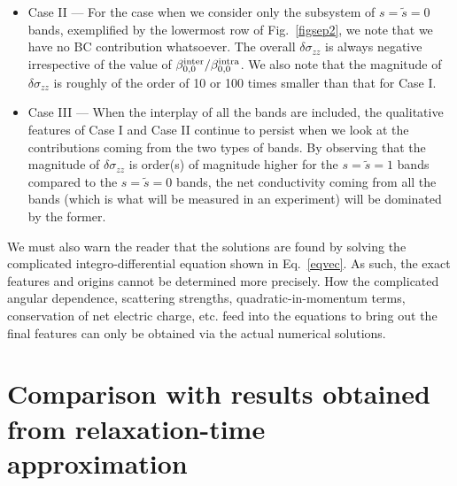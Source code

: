 \documentclass[aps,prb,onecolumn,nofootinbib,citeautoscript,10pt]{revtex4-2}
\begin{document}
\begin{itemize}
$ \delta \sigma_{zz}^{conc} = - 0.0346485 $ for $\beta^{\rm inter}_{1,1} / \beta^{\rm intra}_{1,1} = 2$.
\item  Case II --- For the case when we consider only the subsystem of $s = \tilde s = 0$ bands, exemplified by the lowermost row of Fig.~\ref{figsep2}, we note that we have no BC contribution whatsoever. The overall $\delta \sigma_{zz} $ is always negative irrespective of the value of $\beta^{\rm inter}_{0,0} / \beta^{\rm intra}_{0,0}$. We also note that the magnitude of $\delta \sigma_{zz}$ is roughly of the order of 10 or 100 times smaller than that for Case I.
\item Case III --- When the interplay of all the bands are included, the qualitative features of Case I and Case II continue to persist when we look at the contributions coming from the two types of bands.
By observing that the magnitude of $\delta \sigma_{zz}$ is order(s) of magnitude higher for the $s = \tilde s = 1$ bands compared to the $s = \tilde s = 0$ bands, the net conductivity coming from all the bands (which is what will be measured in an experiment) will be dominated by the former.
\end{itemize}
We must also warn the reader that the solutions are found by solving the complicated integro-differential equation shown in Eq.~\eqref{eqvec}. As such, the exact features and origins cannot be determined more precisely. How the complicated angular dependence, scattering strengths, quadratic-in-momentum terms, conservation of net electric charge, etc. feed into the equations to bring out the final features can only be obtained via the actual numerical solutions.



\section{Comparison with results obtained from relaxation-time approximation}
\label{secsig}
\end{document}
